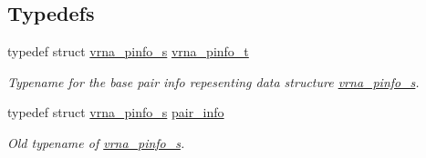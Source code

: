\subsection*{Typedefs}
\begin{DoxyCompactItemize}
\item 
typedef struct \mbox{\hyperlink{group__aln__utils_structvrna__pinfo__s}{vrna\+\_\+pinfo\+\_\+s}} \mbox{\hyperlink{group__aln__utils_ga6660dfca23debee7306e0cd53341263f}{vrna\+\_\+pinfo\+\_\+t}}
\begin{DoxyCompactList}\small\item\em Typename for the base pair info repesenting data structure \mbox{\hyperlink{group__aln__utils_structvrna__pinfo__s}{vrna\+\_\+pinfo\+\_\+s}}. \end{DoxyCompactList}\item 
typedef struct \mbox{\hyperlink{group__aln__utils_structvrna__pinfo__s}{vrna\+\_\+pinfo\+\_\+s}} \mbox{\hyperlink{group__aln__utils_ga7b61662a793ad0aa1ea38efc3a5baacc}{pair\+\_\+info}}
\begin{DoxyCompactList}\small\item\em Old typename of \mbox{\hyperlink{group__aln__utils_structvrna__pinfo__s}{vrna\+\_\+pinfo\+\_\+s}}. \end{DoxyCompactList}\end{DoxyCompactItemize}
